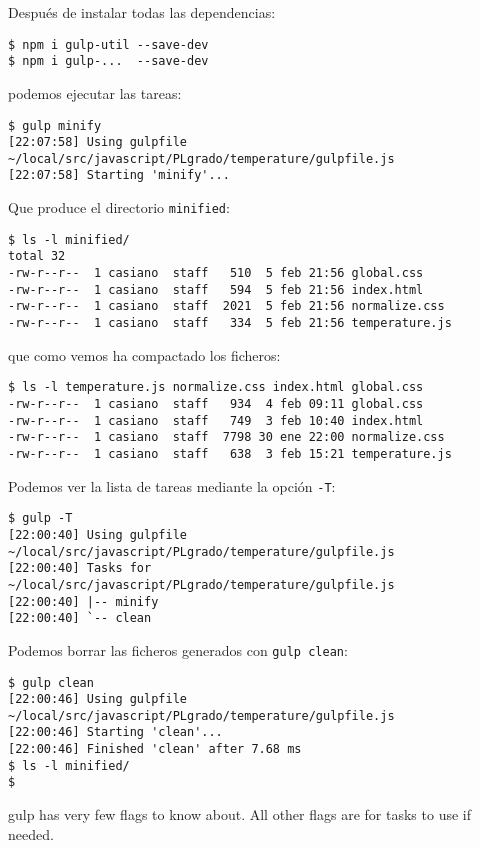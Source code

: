 Después de instalar todas las dependencias:
\begin{verbatim}
$ npm i gulp-util --save-dev
$ npm i gulp-...  --save-dev
\end{verbatim}
podemos ejecutar las tareas:
\begin{verbatim}
$ gulp minify
[22:07:58] Using gulpfile ~/local/src/javascript/PLgrado/temperature/gulpfile.js
[22:07:58] Starting 'minify'...
\end{verbatim}
Que produce el directorio \verb|minified|:
\begin{verbatim}
$ ls -l minified/
total 32
-rw-r--r--  1 casiano  staff   510  5 feb 21:56 global.css
-rw-r--r--  1 casiano  staff   594  5 feb 21:56 index.html
-rw-r--r--  1 casiano  staff  2021  5 feb 21:56 normalize.css
-rw-r--r--  1 casiano  staff   334  5 feb 21:56 temperature.js
\end{verbatim}
que como vemos ha compactado los ficheros:
\begin{verbatim}
$ ls -l temperature.js normalize.css index.html global.css 
-rw-r--r--  1 casiano  staff   934  4 feb 09:11 global.css
-rw-r--r--  1 casiano  staff   749  3 feb 10:40 index.html
-rw-r--r--  1 casiano  staff  7798 30 ene 22:00 normalize.css
-rw-r--r--  1 casiano  staff   638  3 feb 15:21 temperature.js
\end{verbatim}
Podemos ver la lista de tareas mediante la opción \verb|-T|:
\begin{verbatim}
$ gulp -T
[22:00:40] Using gulpfile ~/local/src/javascript/PLgrado/temperature/gulpfile.js
[22:00:40] Tasks for ~/local/src/javascript/PLgrado/temperature/gulpfile.js
[22:00:40] |-- minify
[22:00:40] `-- clean
\end{verbatim}
Podemos borrar las ficheros generados con \verb|gulp clean|:
\begin{verbatim}
$ gulp clean
[22:00:46] Using gulpfile ~/local/src/javascript/PLgrado/temperature/gulpfile.js
[22:00:46] Starting 'clean'...
[22:00:46] Finished 'clean' after 7.68 ms
$ ls -l minified/
$
\end{verbatim}


gulp has very few flags to know about. All other flags are for tasks to use if needed.


